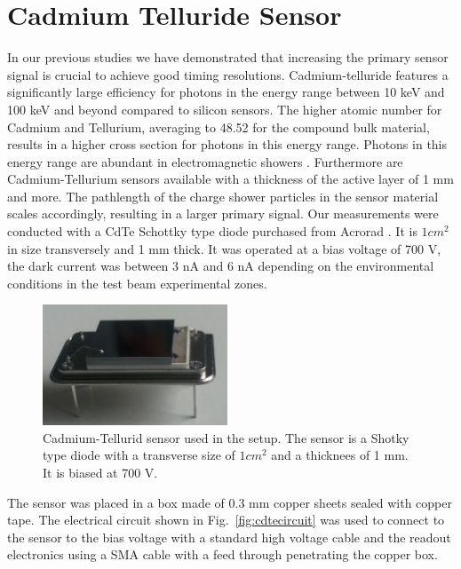 %
%
%
\section{Cadmium Telluride Sensor}
\label{sec:siliconpad}

In our previous studies \cite{allourpapers} we have demonstrated that increasing the primary sensor signal is crucial to achieve good timing resolutions.  
Cadmium-telluride features a significantly large efficiency for photons in the energy range between 10 keV and 100 keV and beyond compared to silicon sensors. The higher atomic number for Cadmium and Tellurium, averaging to 48.52 for the compound bulk material, results in a higher cross section for photons in this energy range. 
Photons in this energy range are abundant in electromagnetic showers \cite{showercomposition}. 
Furthermore are Cadmium-Tellurium sensors available with a thickness of the active layer of 1 mm and more. The pathlength of the charge shower particles in the sensor material scales accordingly, resulting in a larger primary signal.   
%
Our measurements were conducted with a CdTe Schottky type diode purchased from Acrorad \cite{acrorad}. It is $1 cm^2$ in size transversely and 1 mm thick.
It was operated at a bias voltage of 700 V, the dark current was between 3 nA and 6 nA depending on the environmental conditions in the test beam experimental zones.     
%
\begin{figure}[htbp] 
\centering
\includegraphics[width=0.49\textwidth]{figures/CdTeSensor.png} 
\caption{Cadmium-Tellurid sensor used in the setup. The sensor is a Shotky type diode with a transverse size of $1 cm^2$ and a thicknees of 1 mm. It is biased at 700 V.} 
\label{fig:CdTeSensor} 
\end{figure} 
%
The sensor was placed in a box made of 0.3 mm copper sheets sealed with copper tape. 
The electrical circuit shown in Fig.~\ref{fig:cdtecircuit} was used to connect to the sensor to the bias voltage with a standard high voltage cable and the readout electronics using a SMA cable with a feed through penetrating the copper box.
